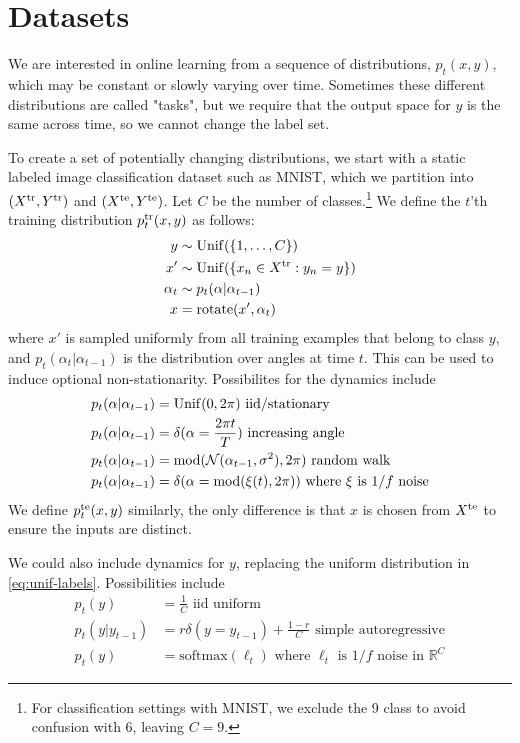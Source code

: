 \section{Datasets}



We are interested in online learning from a sequence of distributions, $p_t(x,y)$, which may be constant or slowly varying over time. Sometimes these different distributions are called "tasks", but we require that the  output space for $y$ is the same across time, so we cannot change the label set.

To create a set of potentially changing distributions,
we start with a static labeled image classification dataset such as MNIST, which we partition into $(X^{\mathrm{tr}}, Y^{\mathrm{tr}})$ and $(X^{\text{te}}, Y^{\text{te}})$.
Let $C$ be the number of classes.\footnote{For classification settings with MNIST, we exclude the 9 class to avoid confusion with 6, leaving $C=9$.} We define the $t$'th training distribution $p_t^{\mathrm{tr}}(x,y)$ as follows:
\begin{align}
y &\sim \mathrm{Unif}(\{1,\ldots,C\}) \label{eq:unif-labels}\\
x' &\sim \mathrm{Unif}(\{ x_n \in X^{\mathrm{tr}}: y_n = y \}) \\
\alpha_t &\sim p_t(\alpha|\alpha_{t-1}) \\
x &= \text{rotate}(x', \alpha_t)
 \end{align}
 where $x'$ is sampled uniformly from all training examples that belong to class $y$,
 and
 $p_t(\alpha_t|\alpha_{t-1})$ is the distribution over angles at time $t$. 
 This can be used to induce optional non-stationarity. 
 Possibilites for the dynamics include
 \begin{align}
p_t(\alpha|\alpha_{t-1})&  =\mathrm{Unif}(0,2\pi)  \text{ iid/stationary} \\
p_t(\alpha|\alpha_{t-1}) &=\delta(\alpha = \frac{2 \pi t}{T}) \text{ increasing angle} \label{eq:increasing-angle}\\
p_t(\alpha|\alpha_{t-1}) &= \text{mod}(\mathcal{N}(\alpha_{t-1}, \sigma^2), 2\pi)  \text{ random walk} \label{eq:diffusion-angle} \\
p_t(\alpha|\alpha_{t-1}) &= \delta(\alpha =  \text{mod}(\xi(t), 2\pi))
 \text{ where $\xi$ is $1/f$ noise} \label{eq:fractal-angle}
\end{align}
We define $p_t^{\text{te}}(x,y)$ similarly, the only difference is that $x$ is chosen from $X^{\text{te}}$ to ensure the inputs are distinct.

We could also include dynamics for $y$, replacing the uniform distribution in \eqref{eq:unif-labels}. Possibilities include
\begin{align}
    p_t(y) &= \frac{1}{C} \text{ iid uniform} \\
    p_t(y|y_{t-1}) &= r\delta(y=y_{t-1}) + \frac{1-r}{C} \text{ simple autoregressive} \\
    p_t(y) &= \text{softmax}(\bm{\ell}_t) \text{ where $\bm{\ell}_t$ is $1/f$ noise in $\mathbb{R}^C$}
\end{align}

